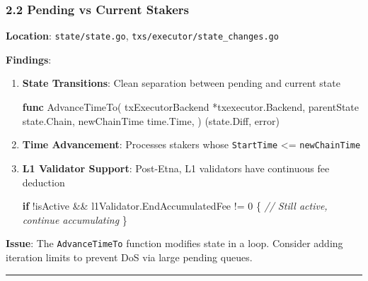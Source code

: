 \documentclass[
]{article}
\newenvironment{Shaded}{}{}
\newcommand{\CommentTok}[1]{\textcolor[rgb]{0.38,0.63,0.69}{\textit{#1}}}
\newcommand{\ControlFlowTok}[1]{\textcolor[rgb]{0.00,0.44,0.13}{\textbf{#1}}}
\newcommand{\DataTypeTok}[1]{\textcolor[rgb]{0.56,0.13,0.00}{#1}}
\newcommand{\DecValTok}[1]{\textcolor[rgb]{0.25,0.63,0.44}{#1}}
\newcommand{\KeywordTok}[1]{\textcolor[rgb]{0.00,0.44,0.13}{\textbf{#1}}}
\newcommand{\NormalTok}[1]{#1}
\newcommand{\OperatorTok}[1]{\textcolor[rgb]{0.40,0.40,0.40}{#1}}
\begin{document}
\subsubsection{2.2 Pending vs Current
Stakers}\label{22-pending-vs-current-stakers}

\textbf{Location}: \texttt{state/state.go},
\texttt{txs/executor/state\_changes.go}

\textbf{Findings}:

\begin{enumerate}
\def\labelenumi{\arabic{enumi}.}
\item
  \textbf{State Transitions}: Clean separation between pending and
  current state

\begin{Shaded}
\begin{Highlighting}[]
\KeywordTok{func}\NormalTok{ AdvanceTimeTo}\OperatorTok{(}
\NormalTok{    txExecutorBackend }\OperatorTok{*}\NormalTok{txexecutor}\OperatorTok{.}\NormalTok{Backend}\OperatorTok{,}
\NormalTok{    parentState state}\OperatorTok{.}\NormalTok{Chain}\OperatorTok{,}
\NormalTok{    newChainTime time}\OperatorTok{.}\NormalTok{Time}\OperatorTok{,}
\OperatorTok{)} \OperatorTok{(}\NormalTok{state}\OperatorTok{.}\NormalTok{Diff}\OperatorTok{,} \DataTypeTok{error}\OperatorTok{)}
\end{Highlighting}
\end{Shaded}
\item
  \textbf{Time Advancement}: Processes stakers whose \texttt{StartTime}
  \textless= \texttt{newChainTime}
\item
  \textbf{L1 Validator Support}: Post-Etna, L1 validators have
  continuous fee deduction

\begin{Shaded}
\begin{Highlighting}[]
\ControlFlowTok{if} \OperatorTok{!}\NormalTok{isActive }\OperatorTok{\&\&}\NormalTok{ l1Validator}\OperatorTok{.}\NormalTok{EndAccumulatedFee }\OperatorTok{!=} \DecValTok{0} \OperatorTok{\{}
    \CommentTok{// Still active, continue accumulating}
\OperatorTok{\}}
\end{Highlighting}
\end{Shaded}
\end{enumerate}

\textbf{Issue}: The \texttt{AdvanceTimeTo} function modifies state in a
loop. Consider adding iteration limits to prevent DoS via large pending
queues.

\begin{center}\rule{0.5\linewidth}{0.5pt}\end{center}
\end{document}
